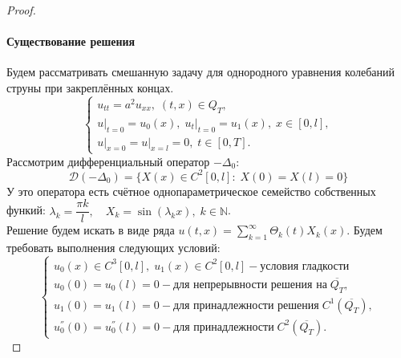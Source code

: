 \documentclass[../main.tex]{subfiles}
\begin{document}
\begin{proof}
\paragraph{Существование решения} Будем рассматривать смешанную задачу для однородного уравнения колебаний струны при закреплённых концах.
\begin{equation*}
\label{eq:16_2}
\begin{cases}
	u_{tt} = a^2u_{xx},\; (t, x) \in Q_T, \\
	u\bigr|_{t = 0} = u_0(x),\; u_t\bigr|_{t = 0} = u_1(x),\; x \in [0, l], \\
	u\bigr|_{x = 0} = u\bigr|_{x = l} = 0,\; t \in [0, T].
\end{cases}
\end{equation*}
Рассмотрим дифференциальный оператор $-\Delta_{0}$:
$$\mathcal{D}(-\Delta_{0}) =\{X(x) \in C^2[0, l]\colon\; X(0) = X(l) = 0\}$$
У это оператора есть счётное однопараметрическое семейство собственных функий: $\lambda_k = \dfrac{\pi k}{l},\quad X_k = \sin(\lambda_k x),\; k \in \mathbb{N}$. \\
Решение будем искать в виде ряда $u(t, x) = \sum\limits_{k = 1}^{\infty} \Theta_k(t)X_k(x)$. Будем требовать выполнения следующих условий:
\begin{equation}
\begin{cases}
	u_0(x) \in C^3[0, l],\; u_1(x) \in C^2[0, l] - \textbf{условия гладкости}\\
	u_0(0) = u_0(l) = 0 - \text{для непрерывности решения на}\; \overline{Q_T}, \\
	u_1(0) = u_1(l) = 0 - \text{для принадлежности решения}\; C^1(\overline{Q_T}), \\
	u^{''}_0(0) = u^{''}_0(l) = 0 - \text{для принадлежности}\; C^2(\overline{Q_T}).
\end{cases}
\end{equation}


\end{proof}
\end{document}
